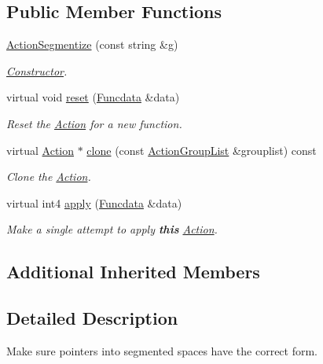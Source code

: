 \subsection*{Public Member Functions}
\begin{DoxyCompactItemize}
\item 
\mbox{\hyperlink{class_action_segmentize_ad2206f23e2af24a5361533763eebfed3}{Action\+Segmentize}} (const string \&g)
\begin{DoxyCompactList}\small\item\em \mbox{\hyperlink{class_constructor}{Constructor}}. \end{DoxyCompactList}\item 
virtual void \mbox{\hyperlink{class_action_segmentize_a97b99ceaa938b5d08789e2d4e59ae67a}{reset}} (\mbox{\hyperlink{class_funcdata}{Funcdata}} \&data)
\begin{DoxyCompactList}\small\item\em Reset the \mbox{\hyperlink{class_action}{Action}} for a new function. \end{DoxyCompactList}\item 
virtual \mbox{\hyperlink{class_action}{Action}} $\ast$ \mbox{\hyperlink{class_action_segmentize_a0fd9bb73aa71eefad72a93cde61a288b}{clone}} (const \mbox{\hyperlink{class_action_group_list}{Action\+Group\+List}} \&grouplist) const
\begin{DoxyCompactList}\small\item\em Clone the \mbox{\hyperlink{class_action}{Action}}. \end{DoxyCompactList}\item 
virtual int4 \mbox{\hyperlink{class_action_segmentize_a3219ac91c09b6c6061d7e91ad1ed9111}{apply}} (\mbox{\hyperlink{class_funcdata}{Funcdata}} \&data)
\begin{DoxyCompactList}\small\item\em Make a single attempt to apply {\bfseries{this}} \mbox{\hyperlink{class_action}{Action}}. \end{DoxyCompactList}\end{DoxyCompactItemize}
\subsection*{Additional Inherited Members}


\subsection{Detailed Description}
Make sure pointers into segmented spaces have the correct form. 


